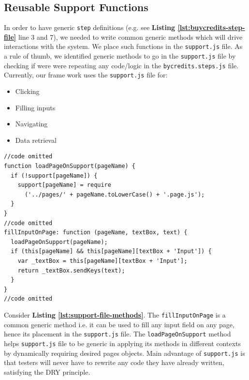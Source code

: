 \subsection{Reusable Support Functions}
\label{subsec:reusable-support-functions}

In order to have generic \texttt{step} definitions (e.g. see \textbf{Listing \ref{lst:buycredits-step-file}} line 3 and 7), we needed to write common generic methods which will drive interactions with the system. We place such functions in the \texttt{support.js} file. As a rule of thumb, we identified generic methods to go in the \texttt{support.js} file by checking if were were repeating any code/logic in the \texttt{bycredits.steps.js} file. Currently, our frame work uses the \texttt{support.js} file for:

\begin{itemize}
\item Clicking
\item Filling inputs
\item Navigating
\item Data retrieval
\end{itemize}

\begin{listing}[H]
\begin{verbatim}
//code omitted
function loadPageOnSupport(pageName) {
  if (!support[pageName]) {
    support[pageName] = require
      ('../pages/' + pageName.toLowerCase() + '.page.js');
  }
}
//code omitted
fillInputOnPage: function (pageName, textBox, text) {
  loadPageOnSupport(pageName);
  if (this[pageName] && this[pageName][textBox + 'Input']) {
    var _textBox = this[pageName][textBox + 'Input'];
    return _textBox.sendKeys(text);
  }
}
//code omitted
\end{verbatim}
\label{lst:support-file-methods}
\end{listing}

Consider \textbf{Listing \ref{lst:support-file-methods}}. The \texttt{fillInputOnPage} is a common generic method i.e. it can be used to fill any input field on any page, hence its placement in the \texttt{support.js} file. The \texttt{loadPageOnSupport} method helps \texttt{support.js} file to be generic in applying its methods in different contexts by dynamically requiring desired pages objects. Main advantage of \texttt{support.js} is that testers will never have to rewrite any code they have already written, satisfying the DRY principle.

